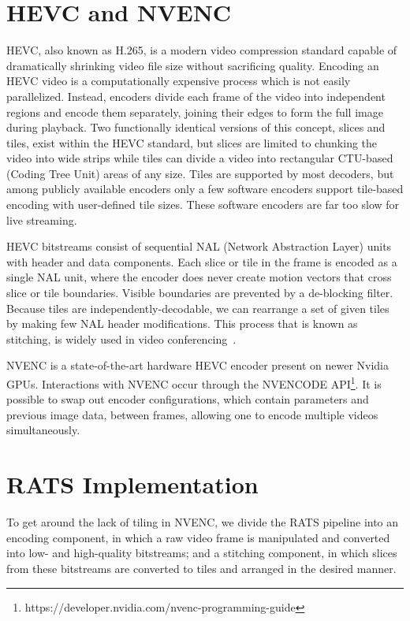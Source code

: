 \section{HEVC and NVENC} \label{hevc}

HEVC, also known as H.265, is a modern video compression standard capable of dramatically shrinking video file size without sacrificing quality. Encoding an HEVC video is a computationally expensive process which is not easily parallelized. Instead, encoders divide each frame of the video into independent regions and encode them separately, joining their edges to form the full image during playback. Two functionally identical versions of this concept, slices and tiles, exist within the HEVC standard, but slices are limited to chunking the video into wide strips while tiles can divide a video into rectangular CTU-based (Coding Tree Unit) areas of any size.
Tiles are supported by most decoders, but among publicly available encoders only a few software encoders support tile-based encoding with user-defined tile sizes. These software encoders are far too slow for live streaming.

HEVC bitstreams consist of sequential NAL (Network Abstraction Layer) units with header and data components.
Each slice or tile in the frame is encoded as a single NAL unit, where the encoder does never create motion vectors that cross slice or tile boundaries. Visible boundaries are prevented by a de-blocking filter.
Because tiles are independently-decodable, we can rearrange a set of given tiles by making few NAL header modifications. This process that is known as stitching, is widely used in video conferencing~\cite{amon2012,feldmann2013,delafuente2017}.

NVENC is a state-of-the-art hardware HEVC encoder present on newer Nvidia GPUs. Interactions with NVENC occur through the NVENCODE API\footnote{https://developer.nvidia.com/nvenc-programming-guide}. It is possible to swap out encoder configurations, which contain parameters and previous image data, between frames, allowing one to encode multiple videos simultaneously.

\section{RATS Implementation} \label{rats}
To get around the lack of tiling in NVENC, we divide the RATS pipeline into an encoding component, in which a raw video frame is manipulated and converted into low- and high-quality bitstreams; and a stitching component, in which slices from these bitstreams are converted to tiles and arranged in the desired manner.

